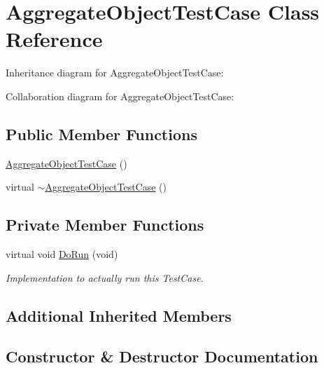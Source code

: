 \hypertarget{classAggregateObjectTestCase}{}\section{Aggregate\+Object\+Test\+Case Class Reference}
\label{classAggregateObjectTestCase}


Inheritance diagram for Aggregate\+Object\+Test\+Case\+:


Collaboration diagram for Aggregate\+Object\+Test\+Case\+:
\subsection*{Public Member Functions}
\begin{DoxyCompactItemize}
\item 
\hyperlink{classAggregateObjectTestCase_a3be2afa882fcc0a5543bcfb4e617b8a3}{Aggregate\+Object\+Test\+Case} ()
\item 
virtual \hyperlink{classAggregateObjectTestCase_af5a5d0517000200f29e17c2c17a3b58a}{$\sim$\+Aggregate\+Object\+Test\+Case} ()
\end{DoxyCompactItemize}
\subsection*{Private Member Functions}
\begin{DoxyCompactItemize}
\item 
virtual void \hyperlink{classAggregateObjectTestCase_a0078f116c79d82795c9102ed86cf4fd7}{Do\+Run} (void)
\begin{DoxyCompactList}\small\item\em Implementation to actually run this Test\+Case. \end{DoxyCompactList}\end{DoxyCompactItemize}
\subsection*{Additional Inherited Members}


\subsection{Constructor \& Destructor Documentation}
